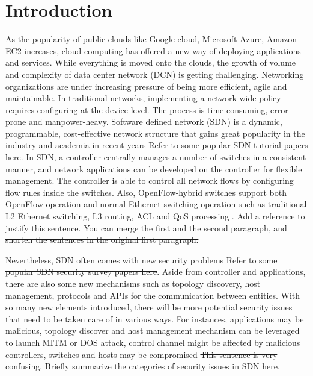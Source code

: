 \chapter{Introduction}
\label{chap:intro}
\setcounter{page}{1}

As the popularity of public clouds like Google cloud, Microsoft Azure, Amazon EC2 increases, cloud computing has offered a new way of deploying applications and services. While everything is moved onto the clouds, the growth of volume and complexity of data center network (DCN) is getting challenging. Networking organizations are under increasing pressure of being more efficient, agile and maintainable. In traditional networks, implementing a network-wide policy requires configuring at the device level. The process is time-consuming, error-prone and manpower-heavy. Software defined network (SDN) is a dynamic, programmable, cost-effective network structure that gains great popularity in the industry and academia in recent years \cite{KRVRAU15, MABPPRST08, LHM10} \sout{{\color{red} Refer to some popular SDN tutorial papers here}}. In SDN, a controller centrally manages a number of switches in a consistent manner, and network applications can be developed on the controller for flexible management. The controller is able to control all network flows by configuring flow rules inside the switches. Also, OpenFlow-hybrid switches support both OpenFlow operation and normal Ethernet switching operation such as traditional L2 Ethernet switching, L3 routing, ACL and QoS processing \cite{OF_SPEC}. \sout{{\color{red} Add a reference to justify this sentence}. {\color{red} You can merge the first and the second paragraph, and shorten the sentences in the original first paragraph.}}

Nevertheless, SDN often comes with new security problems \cite{SOS13, CM}\sout{{\color{red} Refer to some popular SDN security survey papers here}}. Aside from controller and applications, there are also some new mechanisms such as topology discovery, host management, protocols and APIs for the communication between entities. With so many new elements introduced, there will be more potential security issues that need to be taken care of in various ways. For instances, applications may be malicious, topology discover and host management mechanism can be leveraged to launch MITM or DOS attack, control channel might be affected by malicious controllers, switches and hosts may be compromised \sout{{\color{red} This sentence is very confusing}. {\color{red} Briefly summarize the categories of security issues in SDN here.}}

